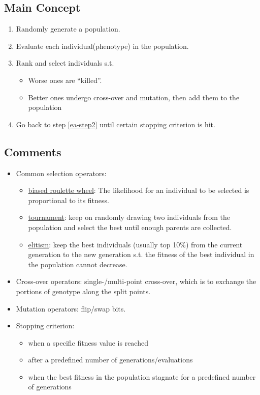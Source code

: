 \documentclass[twocolumn,landscape,10pt]{article}
\theoremstyle{definition}
\begin{document}
\subsection{Main Concept}

\begin{enumerate}
    \item Randomly generate a population.
    \item \label{ea-step2} Evaluate each individual(phenotype) in the population.
    \item Rank and select individuals s.t.
        \begin{itemize}
            \item Worse ones are ``killed''.
            \item Better ones undergo cross-over and mutation, then add them
                to the population
        \end{itemize} 
    \item Go back to step \ref{ea-step2} until certain stopping criterion is
        hit.
\end{enumerate} 

\subsection{Comments}

\begin{itemize}
    \item Common selection operators:
        \begin{itemize}
            \item \underline{biased roulette wheel}: The likelihood for an 
                individual to be selected is proportional to its fitness.
            \item \underline{tournament}: keep on randomly drawing two 
                individuals from the population and select the best 
                until enough parents are collected.
            \item \underline{elitism}: keep the best individuals (usually top
                10\%) from the current generation to the new generation
                s.t. the fitness of the best individual in the population cannot
                decrease.
        \end{itemize} 
    \item Cross-over operators: single-/multi-point cross-over, which is to
        exchange the portions of genotype along the split points.
    \item Mutation operators: flip/swap bits.
    \item Stopping criterion:
        \begin{itemize}
            \item when a specific fitness value is reached
            \item after a predefined number of generations/evaluations
            \item when the best fitness in the population stagnate for a
                predefined number of generations
        \end{itemize} 
\end{itemize} 
\end{document}
